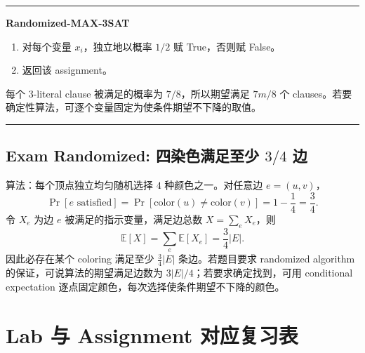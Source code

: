 \documentclass[UTF8,a4paper,11pt]{ctexart}
\newenvironment{algobox}[1]
{\par\medskip\noindent\begin{minipage}{0.96\linewidth}\hrule\vspace{0.35em}\textbf{#1}\par\vspace{0.25em}\small}
{\par\vspace{0.25em}\hrule\end{minipage}\par\medskip}
\begin{document}
\begin{algobox}{Randomized-MAX-3SAT}
\begin{enumerate}
  \item 对每个变量 $x_i$，独立地以概率 $1/2$ 赋 True，否则赋 False。
  \item 返回该 assignment。
\end{enumerate}
每个 3-literal clause 被满足的概率为 $7/8$，所以期望满足 $7m/8$ 个 clauses。若要确定性算法，可逐个变量固定为使条件期望不下降的取值。
\end{algobox}

\subsection{Exam Randomized: 四染色满足至少 $3/4$ 边}

算法：每个顶点独立均匀随机选择 $4$ 种颜色之一。对任意边 $e=(u,v)$，
\[
\Pr[e\text{ satisfied}]=\Pr[\mathrm{color}(u)\ne \mathrm{color}(v)]=1-\frac14=\frac34.
\]
令 $X_e$ 为边 $e$ 被满足的指示变量，满足边总数 $X=\sum_e X_e$，则
\[
\mathbb E[X]=\sum_e \mathbb E[X_e]=\frac34|E|.
\]
因此必存在某个 coloring 满足至少 $\frac34|E|$ 条边。若题目要求 randomized algorithm 的保证，可说算法的期望满足边数为 $3|E|/4$；若要求确定找到，可用 conditional expectation 逐点固定颜色，每次选择使条件期望不下降的颜色。

\section{Lab 与 Assignment 对应复习表}
\end{document}
